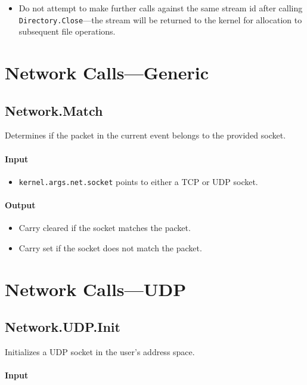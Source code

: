 \begin{itemize}
\item Do not attempt to make further calls against the same stream id after calling \verb+Directory.Close+---the stream will be returned to the kernel for allocation to subsequent file operations.
\end{itemize}

\section*{Network Calls---Generic}

\subsection*{Network.Match}
Determines if the packet in the current event belongs to the provided socket.

\paragraph{Input}

\begin{itemize}
\item \verb+kernel.args.net.socket+ points to either a TCP or UDP socket.
\end{itemize}

\paragraph{Output}

\begin{itemize}
\item Carry cleared if the socket matches the packet.
\item Carry set if the socket does not match the packet.
\end{itemize}

\section*{Network Calls---UDP}

\subsection*{Network.UDP.Init}
Initializes a UDP socket in the user's address space.

\paragraph{Input}

